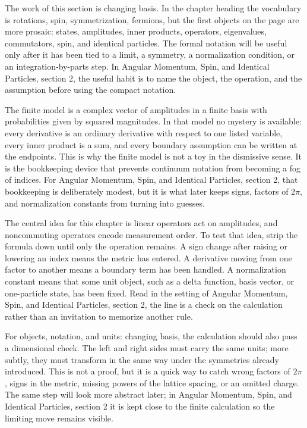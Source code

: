 The work of this section is changing basis.  In the chapter heading the vocabulary is rotations, spin, symmetrization, fermions, but the first objects on the page are more prosaic: states, amplitudes, inner products, operators, eigenvalues, commutators, spin, and identical particles.  The formal notation will be useful only after it has been tied to a limit, a symmetry, a normalization condition, or an integration-by-parts step.  In Angular Momentum, Spin, and Identical Particles, section 2, the useful habit is to name the object, the operation, and the assumption before using the compact notation.

The finite model is a complex vector of amplitudes in a finite basis with probabilities given by squared magnitudes.  In that model no mystery is available: every derivative is an ordinary derivative with respect to one listed variable, every inner product is a sum, and every boundary assumption can be written at the endpoints.  This is why the finite model is not a toy in the dismissive sense.  It is the bookkeeping device that prevents continuum notation from becoming a fog of indices.  For Angular Momentum, Spin, and Identical Particles, section 2, that bookkeeping is deliberately modest, but it is what later keeps signs, factors of \(2\pi\), and normalization constants from turning into guesses.

The central idea for this chapter is linear operators act on amplitudes, and noncommuting operators encode measurement order.  To test that idea, strip the formula down until only the operation remains.  A sign change after raising or lowering an index means the metric has entered.  A derivative moving from one factor to another means a boundary term has been handled.  A normalization constant means that some unit object, such as a delta function, basis vector, or one-particle state, has been fixed.  Read in the setting of Angular Momentum, Spin, and Identical Particles, section 2, the line is a check on the calculation rather than an invitation to memorize another rule.

For objects, notation, and units: changing basis, the calculation should also pass a dimensional check.  The left and right sides must carry the same units; more subtly, they must transform in the same way under the symmetries already introduced.  This is not a proof, but it is a quick way to catch wrong factors of \(2\pi\), signs in the metric, missing powers of the lattice spacing, or an omitted charge.  The same step will look more abstract later; in Angular Momentum, Spin, and Identical Particles, section 2 it is kept close to the finite calculation so the limiting move remains visible.

